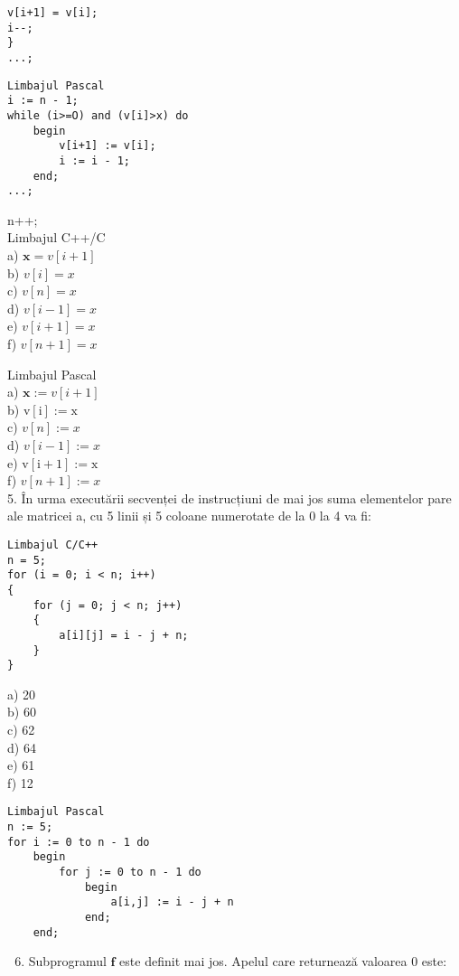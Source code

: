 \begin{verbatim}
v[i+1] = v[i];
i--;
}
...;
\end{verbatim}

\begin{verbatim}
Limbajul Pascal
i := n - 1;
while (i>=O) and (v[i]>x) do
    begin
        v[i+1] := v[i];
        i := i - 1;
    end;
...;
\end{verbatim}

n++;\\
Limbajul C++/C\\
a) $\mathbf{x}=v[i+1]$\\
b) $v[i]=x$\\
c) $v[n]=x$\\
d) $v[i-1]=x$\\
e) $v[i+1]=x$\\
f) $v[n+1]=x$

Limbajul Pascal\\
a) $\mathbf{x}:=v[i+1]$\\
b) $\mathrm{v}[\mathrm{i}]:=\mathrm{x}$\\
c) $v[n]:=x$\\
d) $v[i-1]:=x$\\
e) $\mathrm{v}[\mathrm{i}+1]:=\mathrm{x}$\\
f) $v[n+1]:=x$\\
5. În urma executării secvenței de instrucțiuni de mai jos suma elementelor pare ale matricei a, cu 5 linii și 5 coloane numerotate de la 0 la 4 va fi:

\begin{verbatim}
Limbajul C/C++
n = 5;
for (i = 0; i < n; i++)
{
    for (j = 0; j < n; j++)
    {
        a[i][j] = i - j + n;
    }
}
\end{verbatim}

a) 20\\
b) 60\\
c) 62\\
d) 64\\
e) 61\\
f) 12

\begin{verbatim}
Limbajul Pascal
n := 5;
for i := 0 to n - 1 do
    begin
        for j := 0 to n - 1 do
            begin
                a[i,j] := i - j + n
            end;
    end;
\end{verbatim}

\begin{enumerate}
  \setcounter{enumi}{5}
  \item Subprogramul $\mathbf{f}$ este definit mai jos. Apelul care returnează valoarea 0 este:
\end{enumerate}

